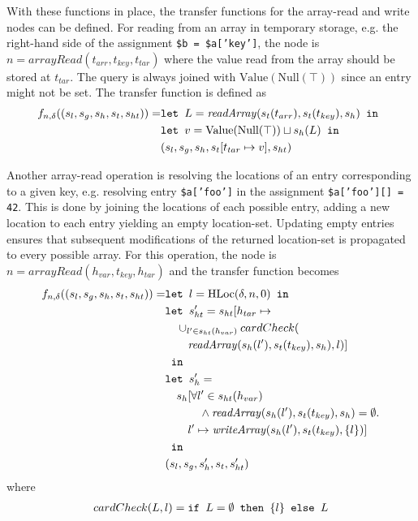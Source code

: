 With these functions in place, the transfer functions for the array-read and write nodes can be defined. For reading from an array in temporary storage, e.g. the right-hand side of the assignment \texttt{\$b = \$a['key']}, the node is $n = \mathit{arrayRead}(t_{arr},t_{key},t_{tar})$ where the value read from the array should be stored at $t_{tar}$. The query is always joined with $\text{Value}(\text{Null}(\top))$ since an entry might not be set. The transfer function is defined as
\begin{align}
f_{n,\delta}((s_l, s_g, s_h, s_t, s_{ht})) =   &\texttt{let } L = \mathit{readArray}(s_t(t_{arr}), s_t(t_{key}) ,s_h) \texttt{ in }\notag\\
                                    &\texttt{let } v = \text{Value}(\text{Null}(\top))\sqcup s_h(L) \texttt{ in }\notag\\
                                    &  (s_l, s_g, s_h, s_t[t_{tar}\mapsto v], s_{ht})
\end{align}

Another array-read operation is resolving the locations of an entry corresponding to a given key, e.g. resolving entry \texttt{\$a['foo']} in the assignment \texttt{\$a['foo'][] = 42}. This is done by joining the locations of each possible entry, adding a new location to each entry yielding an empty location-set. Updating empty entries ensures that subsequent modifications of the returned location-set is propagated to every possible array. For this operation, the node is $n = \mathit{arrayRead}(h_{var},t_{key},h_{tar})$ and the transfer function becomes
\begin{align}
f_{n,\delta}((s_l, s_g, s_h, s_t, s_{ht})) =   &\texttt{let } l = \text{HLoc}(\delta, n, 0) \texttt{ in }\notag\\
                                    &\texttt{let } s_{ht}' = s_{ht}[h_{tar} \mapsto \notag\\
                                    & \quad \cup_{l'\in s_{ht}(h_{var})}cardCheck(\notag\\
                                    &\quad\quad \mathit{readArray}(s_h(l'), s_t(t_{key}), s_h), l)]\notag\\
                                    & \texttt{ in }\notag\\
                                    &\texttt{let } s_h' = \notag\\
                                    &\quad s_h[\forall l' \in s_{ht}(h_{var}) \notag\\
                                    &\quad\quad\quad\wedge \mathit{readArray}(s_h(l'), s_t(t_{key}), s_h) = \emptyset.\notag\\
                                    &\quad\quad l' \mapsto \mathit{writeArray}(s_h(l'), s_t(t_{key}), \{l\})]\notag\\
                                    & \texttt{ in }\notag\\
                                    &(s_l, s_g, s_h', s_t, s_{ht}')
\end{align}
where 
\begin{align}
cardCheck(L, l) = \texttt{if }L = \emptyset\texttt{ then } \{l\} \texttt{ else } L
\end{align}

